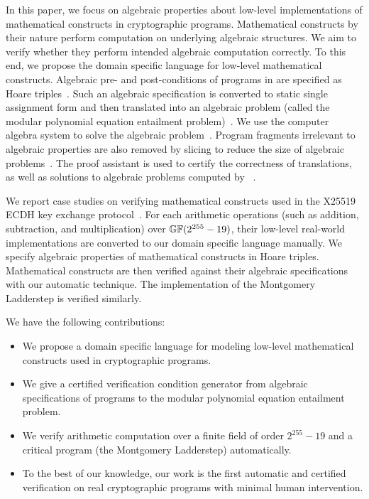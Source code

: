 In this paper, we focus on algebraic properties about low-level
implementations of mathematical constructs in cryptographic programs.
Mathematical constructs by their nature perform computation on
underlying algebraic structures. We aim to verify whether they perform
intended algebraic computation correctly. To this end, we propose the
domain specific language \mydsl for low-level 
mathematical constructs. Algebraic pre- and post-conditions of
programs in \mydsl are specified as Hoare
triples~\cite{H:69:ABCP}. 
Such an algebraic specification is converted to static single 
assignment form and then translated into an algebraic problem (called 
the modular polynomial equation entailment
problem)~\cite{AWZ:88:DQVP,H:07:AENTP}. We use the computer
algebra system \singular to solve the algebraic problem~\cite{GP:08:SICA}. 
Program fragments irrelevant to algebraic properties are also
removed by slicing to reduce the size of algebraic problems~\cite{W:81:PS}.
The proof assistant \coq is used to certify the
correctness of translations, as well as solutions to algebraic
problems computed by \singular~\cite{YC:2004:ITPPDC}.

We report case studies on verifying mathematical constructs used in
the X25519 ECDH key exchange protocol~\cite{BDL+:11:HSHSS,BDL+:12:HSHSS}. 
For each arithmetic operations
(such as addition, subtraction, and multiplication) over $\mathbb{GF}(2^{255} - 19)$,
their low-level real-world implementations are converted to our domain
specific language \mydsl manually. We specify algebraic properties
of mathematical constructs in Hoare triples. Mathematical constructs
are then verified against their algebraic
specifications with our automatic technique. 
The implementation of the Montgomery Ladderstep is 
verified similarly.  

We have the following contributions:
\begin{itemize}
\item We propose a domain specific language \mydsl for modeling low-level
  mathematical constructs used in cryptographic programs.
\item We give a certified verification condition generator from
  algebraic specifications of programs to the modular polynomial
  equation entailment problem.
\item We verify arithmetic computation over a finite field of order
  $2^{255} - 19$ and a
  critical program (the Montgomery Ladderstep) automatically.
\item To the best of our knowledge, our work is the first automatic
  and certified verification on real cryptographic programs with
  minimal human intervention.
\end{itemize}

